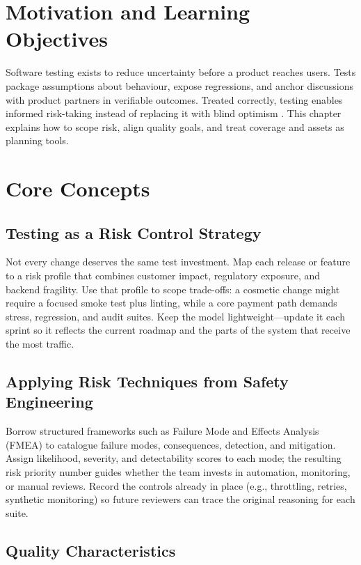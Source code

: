 \section{Motivation and Learning Objectives}

Software testing exists to reduce uncertainty before a product reaches users. Tests package assumptions about behaviour, expose regressions, and anchor discussions with product partners in verifiable outcomes. Treated correctly, testing enables informed risk-taking instead of replacing it with blind optimism \citep{beizer1995software}. This chapter explains how to scope risk, align quality goals, and treat coverage and assets as planning tools.

\section{Core Concepts}

\subsection{Testing as a Risk Control Strategy}

Not every change deserves the same test investment. Map each release or feature to a risk profile that combines customer impact, regulatory exposure, and backend fragility. Use that profile to scope trade-offs: a cosmetic change might require a focused smoke test plus linting, while a core payment path demands stress, regression, and audit suites. Keep the model lightweight—update it each sprint so it reflects the current roadmap and the parts of the system that receive the most traffic.

\subsection{Applying Risk Techniques from Safety Engineering}

Borrow structured frameworks such as Failure Mode and Effects Analysis (FMEA) to catalogue failure modes, consequences, detection, and mitigation. Assign likelihood, severity, and detectability scores to each mode; the resulting risk priority number guides whether the team invests in automation, monitoring, or manual reviews. Record the controls already in place (e.g., throttling, retries, synthetic monitoring) so future reviewers can trace the original reasoning for each suite.

\subsection{Quality Characteristics}

